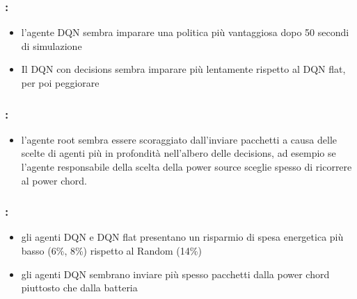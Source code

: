 \documentclass[compress]{beamer}
\begin{document}
\begin{frame}
    \frametitle{\secname: \subsecname}
    \begin{figure}
        \centering
        
        \label{fig:cumulative_reward_dqnDeep_dqnFlat_random_defaultConfig}
    \end{figure}
    \begin{itemize}
        \item l'agente DQN sembra imparare una politica più vantaggiosa dopo
         50 secondi di simulazione
        \item Il DQN con decisions sembra
        imparare più lentamente rispetto al DQN flat, per poi peggiorare
    \end{itemize}
\end{frame}
\begin{frame}
    \frametitle{\secname: \subsecname}
    \begin{figure}
        \centering
        
        \label{fig:sendCount_allAgents_defaultConfig}
    \end{figure}
    \begin{itemize}
        \item l'agente root sembra essere scoraggiato dall'inviare pacchetti a causa delle scelte di agenti
        più in profondità nell'albero delle decisions, ad esempio se l'agente responsabile della
        scelta della power source sceglie spesso di ricorrere al power chord.
    \end{itemize}
\end{frame}
\begin{frame}
    \frametitle{\secname: \subsecname}
    \begin{figure}
        \centering
        
        \label{fig:energySaving_defaultConfig_allAgents}
        \end{figure}
    \only<+> {\begin{itemize}
        \item gli agenti DQN e DQN flat presentano un risparmio di spesa energetica più basso (6\%, 8\%) rispetto al Random (14\%)
        \item gli agenti DQN sembrano inviare più spesso pacchetti dalla power chord piuttosto che dalla batteria
    \end{itemize}}
\end{frame}
\end{document}

